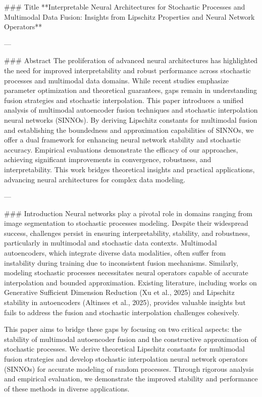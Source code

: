 ### Title  
**Interpretable Neural Architectures for Stochastic Processes and Multimodal Data Fusion: Insights from Lipschitz Properties and Neural Network Operators**

---

### Abstract  
The proliferation of advanced neural architectures has highlighted the need for improved interpretability and robust performance across stochastic processes and multimodal data domains. While recent studies emphasize parameter optimization and theoretical guarantees, gaps remain in understanding fusion strategies and stochastic interpolation. This paper introduces a unified analysis of multimodal autoencoder fusion techniques and stochastic interpolation neural networks (SINNOs). By deriving Lipschitz constants for multimodal fusion and establishing the boundedness and approximation capabilities of SINNOs, we offer a dual framework for enhancing neural network stability and stochastic accuracy. Empirical evaluations demonstrate the efficacy of our approaches, achieving significant improvements in convergence, robustness, and interpretability. This work bridges theoretical insights and practical applications, advancing neural architectures for complex data modeling.

---

### Introduction  
Neural networks play a pivotal role in domains ranging from image segmentation to stochastic processes modeling. Despite their widespread success, challenges persist in ensuring interpretability, stability, and robustness, particularly in multimodal and stochastic data contexts. Multimodal autoencoders, which integrate diverse data modalities, often suffer from instability during training due to inconsistent fusion mechanisms. Similarly, modeling stochastic processes necessitates neural operators capable of accurate interpolation and bounded approximation. Existing literature, including works on Generative Sufficient Dimension Reduction (Xu et al., 2025) and Lipschitz stability in autoencoders (Altinses et al., 2025), provides valuable insights but fails to address the fusion and stochastic interpolation challenges cohesively.

This paper aims to bridge these gaps by focusing on two critical aspects: the stability of multimodal autoencoder fusion and the constructive approximation of stochastic processes. We derive theoretical Lipschitz constants for multimodal fusion strategies and develop stochastic interpolation neural network operators (SINNOs) for accurate modeling of random processes. Through rigorous analysis and empirical evaluation, we demonstrate the improved stability and performance of these methods in diverse applications.

